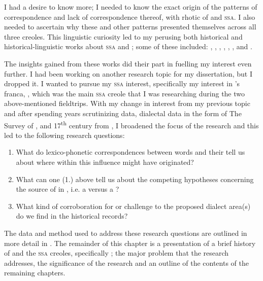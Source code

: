 I had a desire to know more; I needed to know the exact origin of the patterns of correspondence and lack of correspondence thereof, with rhotic  of  and \textsc{ssa}. I also needed to ascertain why these and other patterns presented themselves across all three creoles. This linguistic curiosity led to my perusing both historical and historical-linguistic works about \textsc{ssa}  and ; some of these included: \citet{Bridenbaugh68},  \citet{Esposito82},   \citet{Hoefte98}, \citet{Kambel99},  \citet{Rens53},  \citet{Muysken86},  \citet{Smith87} and   \citet{Smith01}.

The insights gained from these works did their part in fuelling my interest even further. I had been working on another research topic for my dissertation, but I dropped it. I wanted to pursue my \textsc{ssa}  interest, specifically my interest in 's  franca, , which was the main \textsc{ssa}  creole that I was researching during the two above-mentioned fieldtrips. With my change in interest from my previous topic and after spending years scrutinizing  data,  dialectal  data in the form of The Survey of    \citep{Orton6271}, and 17\textsuperscript{th} century  from , I broadened the focus of the research and this led to the following research questions:

\begin{enumerate}
\item What do lexico-phonetic correspondences between  words and their   tell us about where within  this influence might have originated?
\item What can one (1.) above tell us about the competing hypotheses concerning the source of  in , i.e. a  versus a ?
\item What kind of corroboration for or challenge to the proposed dialect area(s) do we find in the historical records?
\end{enumerate}

The data and method used to address these research questions are outlined in more detail in . The remainder of this chapter is a presentation of a brief history of  and the \textsc{ssa}  creoles, specifically ; the major problem that the research addresses, the significance of the research and an outline of the contents of the remaining chapters.

